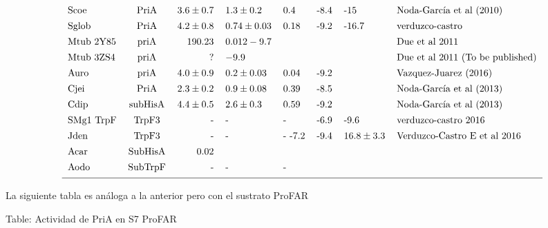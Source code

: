 \documentclass[12pt,twoside]{reedthesis}
\begin{document}
\[{\begin{tabular}{ l c r l l l l l}
  Scoe        &PriA   &$  3.6\pm0.7     $&$ 1.3\pm0.2     $  &0.4                   &-8.4   &-15       &Noda-García et al (2010)\\ [1ex]
  Sglob       &PriA   & $4.2\pm0.8     $ & $0.74\pm0.03    $   &0.18                  &-9.2     &-16.7       &verduzco-castro\\ [1ex]
  Mtub 2Y85   &priA   &$  19  0.23      $&$0.012  -9.7          $&                      &       &          &Due et al 2011\\ [1ex]
  Mtub 3ZS4   &priA   &$  ?                 $&$-9.9               $&                      &       &          &Due et al 2011 (To be published)\\ [1ex]
  Auro        &priA   &$  4.0 \pm 0.9 $&$0.2 \pm 0.03   $&0.04                    &-9.2       &          &Vazquez-Juarez (2016)\\ [1ex]
  Cjei        &PriA   &$  2.3 \pm 0.2 $&$0.9 \pm 0.08   $&0.39                    &-8.5       &          &Noda-García et al (2013)\\ [1ex]
  Cdip        &subHisA&$  4.4 \pm 0.5 $&$2.6 \pm 0.3      $&0.59                  &-9.2       &          &Noda-García et al (2013)\\ [1ex]
  SMg1 TrpF   &TrpF3  &   -                &-                &-                       &-6.9     &-9.6      &verduzco-castro 2016\\ [1ex]
  Jden        &TrpF3  &   -                &-                &-          -7.2         &-9.4     &$16.8\pm3.3$&    Verduzco-Castro E et al  2016\\ [1ex]
  Acar      &SubHisA& 0.02                     &                 &                        &       &          &            \\ [1ex]
  Aodo        &SubTrpF&       -              &-                  &-                     &       &          &\\ [1ex]
  \hline
  \end{tabular}}
  \label{tab:PriAPRA}  
  \]
  
  \clearpage   La siguiente tabla es análoga a la anterior pero con el
  sustrato ProFAR
  
  Table: Actividad de PriA en S7 ProFAR \label{tab:PriAProFAR}
  
\end{document}
